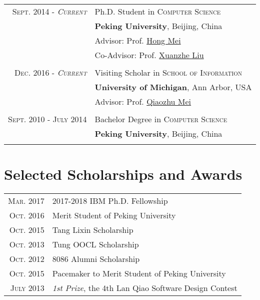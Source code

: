 \documentclass[a4paper,10pt]{article}
\begin{document}
\begin{tabular}{rl}	
	\textsc{Sept. 2014 - \emph{Current}} &Ph.D. Student in \textsc{Computer Science} \\
	 & \normalsize\textbf{Peking University}, Beijing, China \\
	 & \small Advisor: Prof. \href{http://sei.pku.edu.cn/~meih/index_en.html}{Hong Mei} \\
	 & \small Co-Advisor: Prof. \href{http://sei.pku.edu.cn/~liuxzh/}{Xuanzhe Liu} \\
	 & \\
	 
	\textsc{Dec. 2016 - \emph{Current}} &Visiting Scholar in \textsc{School of Information} \\
	 & \normalsize\textbf{University of Michigan}, Ann Arbor, USA \\
	 & \small Advisor: Prof. \href{http://www-personal.umich.edu/~qmei/}{Qiaozhu Mei} \\
	 & \\

	\textsc{Sept. 2010 - July 2014} & Bachelor Degree in \textsc{Computer Science} \\
	 & \normalsize\textbf{Peking University}, Beijing, China \\
	 & \\
\end{tabular}

\section{Selected Scholarships and Awards}
\begin{tabular}{rl}
 \textsc{Mar.} 2017 & 2017-2018 IBM Ph.D. Fellowship \\
 \textsc{Oct.} 2016 & Merit Student of Peking University \\
 \textsc{Oct.} 2015 & Tang Lixin Scholarship \\
 \textsc{Oct.} 2013 & Tung OOCL Scholarship \\
 \textsc{Oct.} 2012 & 8086 Alumni Scholarship \\
 \textsc{Oct.} 2015 & Pacemaker to Merit Student of Peking University \\
 \textsc{July} 2013 & \emph{1st Prize}, the 4th Lan Qiao Software Design Contest \\

 
\end{tabular}
\end{document}
